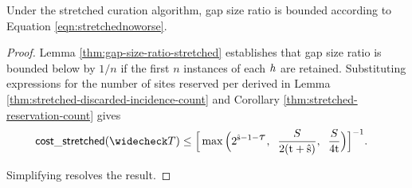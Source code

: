 \begin{theorem}
\label{thm:stretched-gap-size}
Under the stretched curation algorithm, gap size ratio is bounded according to Equation \ref{eqn:stretchednoworse}.
\end{theorem}
\begin{proof}

Lemma \ref{thm:gap-size-ratio-stretched} establishes that gap size ratio is bounded below by $1/n$ if the first $n$ instances of each \hv{} $\colorh$ are retained.
Substituting expressions for the number of sites reserved per \hv{} derived in Lemma \ref{thm:stretched-discarded-incidence-count} and Corollary \ref{thm:stretched-reservation-count} gives
\begin{align*}
  \mathsf{cost\_stretched}(\colorTbar)
  &\leq
  \Big[
    \max\Big(
      2^{\colors - 1 - \colortau},\;\;
      \frac{\colorS}{2(\colort + \colors)},\;\;
      \frac{\colorS}{4\colort}
    \Big)
  \Big]^{-1}.
\end{align*}

Simplifying resolves the result.

\end{proof}
